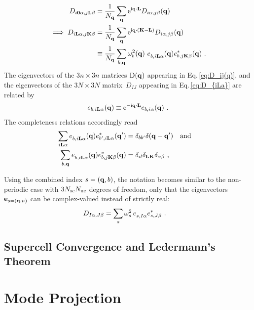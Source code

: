 \begin{align}
	D_{i \b 0 \alpha, j \b L \beta}
		& = \frac{1}{N_{\b q}} \sum_{\b q} {\rm e}^{\im \b q \cdot \b L} {D}_{i \alpha, j \beta} (\b q) \\
\implies
	D_{i \b L \alpha, j \b K \beta}  
		& = \frac{1}{N_{\b q}} \sum_{\b q} {\rm e}^{\im \b q \cdot (\b K - \b L)} {D}_{i \alpha, j \beta} (\b q) \\
		& \equiv \frac{1}{N_{\b q}} \sum_{b, \b q} \omega_b^2 (\b q) ~ \fD e_{b, i \b L \alpha} (\b q) e^{\ast}_{b, j \b K \beta} (\b q)~.
	\label{eq:D_{iLa}}
\end{align}
The eigenvectors of the $3n \times 3n$ matrices $\mathrm D ({\bf q})$ appearing in Eq.\,\eqref{eq:D_ij(q)}, and the eigenvectors of the $3N \times 3N$ matrix~$D_{IJ}$ appearing in Eq.\,\eqref{eq:D_{iLa}} are related by
\begin{align}
	e_{b, i {\bf L} \alpha} ({\bf q})
		\equiv {\rm e}^{- {\rm i} {\bf q}  \cdot {\bf L}} e_{b, i \alpha} ({\bf q})~.
\end{align}
The completeness relations accordingly read
\begin{align}
	\sum_{i \b L \alpha} \fD e_{b, i \b L \alpha} (\b q) e^\ast_{b', i \b L \alpha} (\b q') 
		&= \delta_{b b'} \delta (\b q - \b q') \quad \text{and} \quad \\
	\sum_{b, \b q} \fD e_{b, i \b L \alpha} (\b q) e^\ast_{b, j \b K \beta} (\b q)
		&= \delta_{il} \delta_{\b L \b K} \delta_{\alpha \beta}~,
	\label{eq:completeness.e_bq}
\end{align}

Using the combined index $s = ({\bf q}, b)$, the notation becomes similar to the non-periodic case with $3N_{\rm sc} N_{\rm uc}$ degrees of freedom, only that the eigenvectors ${\bf e}_{s = ({\bf q}, n)}$ can be complex-valued instead of strictly real:
\begin{align}
	D_{I \alpha, J \beta}
		&= \sum_s \omega^2_s \, \fD e_{s, I \alpha} e^\ast_{s, J \beta}~.
\end{align}

\subsection{Supercell Convergence and Ledermann's Theorem}



\section{Mode Projection}

